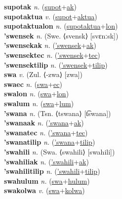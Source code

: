 \textbf{supotak} \textit{n.} (\hyperref[supot]{supot}+\hyperref[ak]{ak})
 \label{supotak} \\
\textbf{supotaktua} \textit{v.} (\hyperref[supot]{supot}+\hyperref[aktua]{aktua})
 \label{supotaktua} \\
\textbf{supotaktualon} \textit{n.} (\hyperref[supotaktua]{supotaktua}+\hyperref[lon]{lon})
 \label{supotaktualon} \\
\textbf{'swensek} \textit{n.} (Swe. ⟨svensk⟩ [svɛnːsk])
 \label{'swensek} \\
\textbf{'swensekak} \textit{n.} (\hyperref['swensek]{'swensek}+\hyperref[ak]{ak})
 \label{'swensekak} \\
\textbf{'swensektec} \textit{n.} (\hyperref['swensek]{'swensek}+\hyperref[tec]{tec})
 \label{'swensektec} \\
\textbf{'swensektilip} \textit{n.} (\hyperref['swensek]{'swensek}+\hyperref[tilip]{tilip})
 \label{'swensektilip} \\
\textbf{swa} \textit{v.} (Zul. ⟨-zwa⟩ [zwa])
 \label{swa} \\
\textbf{swaec} \textit{n.} (\hyperref[swa]{swa}+\hyperref[ec]{ec})
 \label{swaec} \\
\textbf{swalon} \textit{n.} (\hyperref[swa]{swa}+\hyperref[lon]{lon})
 \label{swalon} \\
\textbf{swalum} \textit{n.} (\hyperref[swa]{swa}+\hyperref[lum]{lum})
 \label{swalum} \\
\textbf{'swana} \textit{n.} (Tsn. ⟨tswana⟩ [t͡swana])
 \label{'swana} \\
\textbf{'swanaak} \textit{n.} (\hyperref['swana]{'swana}+\hyperref[ak]{ak})
 \label{'swanaak} \\
\textbf{'swanatec} \textit{n.} (\hyperref['swana]{'swana}+\hyperref[tec]{tec})
 \label{'swanatec} \\
\textbf{'swanatilip} \textit{n.} (\hyperref['swana]{'swana}+\hyperref[tilip]{tilip})
 \label{'swanatilip} \\
\textbf{'swahili} \textit{n.} (Swa. ⟨swahili⟩ [swahili])
 \label{'swahili} \\
\textbf{'swahiliak} \textit{n.} (\hyperref['swahili]{'swahili}+\hyperref[ak]{ak})
 \label{'swahiliak} \\
\textbf{'swahilitilip} \textit{n.} (\hyperref['swahili]{'swahili}+\hyperref[tilip]{tilip})
 \label{'swahilitilip} \\
\textbf{swahulum} \textit{n.} (\hyperref[swa]{swa}+\hyperref[hulum]{hulum})
 \label{swahulum} \\
\textbf{swakolwa} \textit{v.} (\hyperref[swa]{swa}+\hyperref[kolwa]{kolwa})

